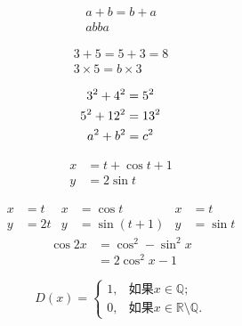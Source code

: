 \documentclass{ctexart}
\begin{document}
		\begin{gather}
	a+b=b+a \\ 
	ab	ba 
	\end{gather}

\begin{gather*}
 	3+5=5+3 = 8  \\ 
 	3 \times 5 = b \times 3 
\end{gather*}

\begin{gather}
	3^2+4^2=5^2 \notag \\ 
	5^2+12^2=13^2 \notag \\ 
	a^2+b^2=c^2 \notag \\ 
\end{gather}

\begin{align}
	x & = t+\cos t+1 \\
	y & =2 \sin t 
\end{align}

\begin{align*}
	x&=t&x&= \cos t & x &=t \\
	y &= 2t & y & =\sin (t+1)& y & =\sin t 
\end{align*}
\begin{equation}
\begin{split}
\cos 2x &= \cos^2 - \sin^2 x \\ 
&=2\cos^2 x - 1 
\end{split}
\end{equation} 

\begin{equation}
	D(x) = \begin{cases}
	1,& \text{如果} x \in \mathbb{Q}; \\ 
	0,& \text{如果}x \in \mathbb{R}\setminus \mathbb{Q}. 
	\end{cases}
\end{equation}
\end{document}
